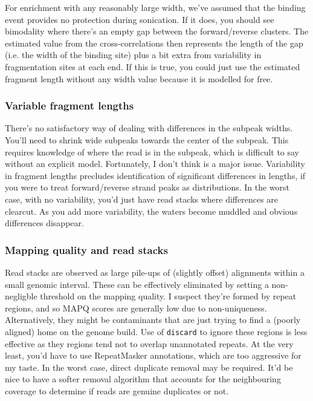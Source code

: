 \documentclass[12pt]{report}
\newcommand{\code}[1]{{\small\texttt{#1}}}
\begin{document}
For enrichment with any reasonably large width, we've assumed that the binding event provides no protection during sonication. 
If it does, you should see bimodality where there's an empty gap between the forward/reverse clusters. 
The estimated value from the cross-correlations then represents the length of the gap (i.e. the width of the binding site) plus a bit extra from variability in fragmentation sites at each end. 
If this is true, you could just use the estimated fragment length without any width value because it is modelled for free.

\subsubsection*{Variable fragment lengths}

There's no satisfactory way of dealing with differences in the subpeak widths.
You'll need to shrink wide subpeaks towards the center of the subpeak.
This requires knowledge of where the read is in the subpeak, which is difficult to say without an explicit model.
Fortunately, I don't think is a major issue.
Variability in fragment lengths precludes identification of significant differences in lengths, if you were to treat forward/reverse strand peaks as distributions. 
In the worst case, with no variability, you'd just have read stacks where differences are clearcut.
As you add more variability, the waters become muddled and obvious differences disappear.

\subsubsection*{Mapping quality and read stacks}

Read stacks are observed as large pile-ups of (slightly offset) alignments within a small genomic interval.
These can be effectively eliminated by setting a non-negligble threshold on the mapping quality.
I suspect they're formed by repeat regions, and so MAPQ scores are generally low due to non-uniqueness.
Alternatively, they might be contaminants that are just trying to find a (poorly aligned) home on the genome build.
Use of \code{discard} to ignore these regions is less effective as they regions tend not to overlap unannotated repeats.
At the very least, you'd have to use RepeatMasker annotations, which are too aggressive for my taste.
In the worst case, direct duplicate removal may be required.
It'd be nice to have a softer removal algorithm that accounts for the neighbouring coverage to determine if reads are genuine duplicates or not.
\end{document}
